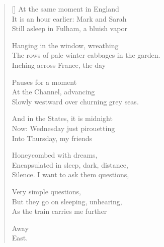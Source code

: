 \label{ch:arabesque}
\settowidth{\versewidth}{                                                              East.}
\begin{verse}[\versewidth]
At the same moment in England\\
It is an hour earlier: Mark and Sarah\\
Still asleep in Fulham, a bluish vapor

Hanging in the window, wreathing\\
The rows of pale winter cabbages in the garden.\\
Inching across France, the day

Pauses for a moment\\
At the Channel, advancing\\
Slowly westward over churning grey seas.

And in the States, it is midnight\\
Now: Wednesday just pirouetting\\
Into Thursday, my friends

Honeycombed with dreams,\\
Encapsulated in sleep, dark, distance,\\
Silence.   I want to ask them questions,

Very simple questions,\\
But they go on sleeping, unhearing,\\
As the train carries me further

                                                   Away\\
                                                              East.
\end{verse}
